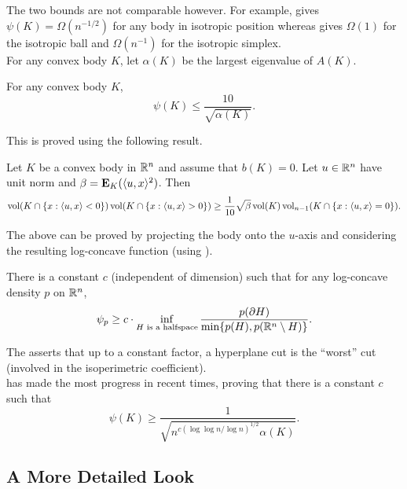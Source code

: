 		The two bounds  are not comparable however. For example,  gives $\psi(K)=\Omega(n^{-1/2})$ for any body in isotropic position whereas  gives $\Omega(1)$ for the isotropic ball and $\Omega(n^{-1})$ for the isotropic simplex.\\

		For any convex body $K$, let $\alpha(K)$ be the largest eigenvalue of $A(K)$. 

		\begin{theorem}
			\label{kls conj hyperplane}
			For any convex body $K$,
			\[ \psi(K) \leq \frac{10}{\sqrt{\alpha(K)}}. \]
		\end{theorem}

		This is proved using the following result.

		\begin{theorem}
			Let $K$ be a convex body in $\mathbb{R}^n$ and assume that $b(K)=0$. Let $u\in\mathbb{R}^n$ have unit norm and $\beta=\textbf{E}_K(\langle u,x\rangle^2)$. Then
			\[ \operatorname{vol}(K \cap \{x : \langle u,x\rangle < 0\}) \operatorname{vol}(K \cap \{x : \langle u,x\rangle > 0\}) \geq \frac{1}{10}\sqrt{\beta}\operatorname{vol}(K)\operatorname{vol}_{n-1}(K \cap \{x : \langle u,x\rangle = 0\}). \]
		\end{theorem}

		The above can be proved by projecting the body onto the $u$-axis and considering the resulting log-concave function (using ).

		\begin{fcon}
			\label{con: kls conjecture}
			There is a constant $c$ (independent of dimension) such that for any log-concave density $p$ on $\mathbb{R}^n$,
			\[ \psi_p \geq c \cdot \inf_{H\text{ is a halfspace}} \frac{p(\partial H)}{\min\{p(H),p(\mathbb{R}^n\setminus H)\}}. \]
		\end{fcon}

		The  asserts that up to a constant factor, a hyperplane cut is the ``worst'' cut (involved in the isoperimetric coefficient).\\

		\cite{chen2021constant} has made the most progress in recent times, proving that there is a constant $c$ such that
		\[ \psi(K) \geq \frac{1}{\sqrt{ n^{c\left(\log\log n/\log n\right)^{1/2}} \alpha(K)}}. \]

\subsection{A More Detailed Look}

